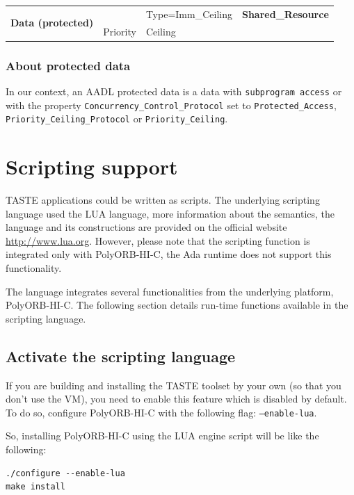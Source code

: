 \documentclass[11pt]{book}
\newcommand{\tbf}[1]{\textbf{#1}}
\begin{document}
{\begin{tabular}{|c|p{5cm}|p{5cm}|c|}
\multicolumn{1}{|c|}{\multirow{2}{*}{\tbf{Data (protected)}}} &
\multicolumn{1}{|p{4cm}|}{}                             &   
\multicolumn{1}{|p{4cm}|}{Type=Imm\_Ceiling}                                         &   
\multicolumn{1}{|c|}{\tbf{Shared\_Resource}} \\  \cline {2-3}
\multicolumn{1}{|c|}{} &
\multicolumn{1}{|p{4cm}|}{Priority}                             &   
\multicolumn{1}{|p{4cm}|}{Ceiling}                                         &   
\multicolumn{1}{|c|}{} \\  \cline {2-3}
\hline \hline
\end{tabular}

\normalsize
   \subsection{About protected data}
   In our context, an AADL protected data is a data with \texttt{subprogram access} or with the property \texttt{Concurrency\_Control\_Protocol}
   set to \texttt{Protected\_Access}, \texttt{Priority\_Ceiling\_Protocol} or
   \texttt{Priority\_Ceiling}.

\chapter{Scripting support}
TASTE applications could be written as scripts. The underlying scripting
language used the LUA language, more information about the semantics, the
language and its constructions are provided on the official website
\url{http://www.lua.org}. However, please note that the scripting function
is integrated only with PolyORB-HI-C, the Ada runtime does not support this
functionality.

The language integrates several functionalities from the underlying platform,
PolyORB-HI-C. The following section details run-time functions available in the
scripting language.

   \section{Activate the scripting language}
   If you are building and installing the TASTE toolset by your own (so that
   you don't use the VM), you need to enable this feature which is disabled
   by default. To do so, configure PolyORB-HI-C with the following flag:
   \texttt{--enable-lua}.

   So, installing PolyORB-HI-C using the LUA engine script will be like the
   following:
   \begin{verbatim}
./configure --enable-lua
make install
   \end{verbatim}

}
\end{document}
